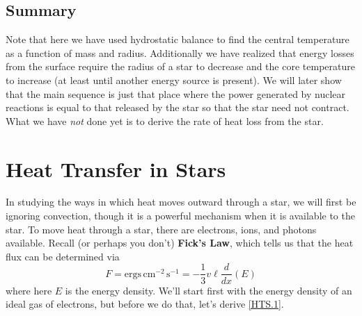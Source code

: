 \documentclass[10pt]{article}
\numberwithin{equation}{section}
\begin{document}
	\subsection{Summary}
		Note that here we have used hydrostatic balance to
                find the central temperature as a function of mass and
                radius. Additionally we have realized that energy
                losses from the surface require the radius of a star
                to decrease and the core temperature to increase (at
                least until another energy source is present). We will
                later show that the main sequence is just that place
                where the power generated by nuclear reactions is
                equal to that released by the star so that the star
                need not contract. What we have \emph{not} done yet is to derive the rate of heat loss from the star.
\section{Heat Transfer in Stars}
	In studying the ways in which heat moves outward through a star, we will first be ignoring convection, though it is a powerful mechanism when it is available to the star. To move heat through a star, there are electrons, ions, and photons available. Recall (or perhaps you don't) \textbf{Fick's Law}, which tells us that the heat flux can be determined via
	\begin{equation}
		\label{HTS.1} F=\mathrm{ergs\,cm^{-2}\,s^{-1}}=-\frac{1}{3}v\ell\frac{d}{dx}(E)
	\end{equation}
	where here $E$ is the energy density. We'll start first with
        the energy density of an ideal gas of electrons, but before we
        do that, let's derive \eqref{HTS.1}.
\end{document}

